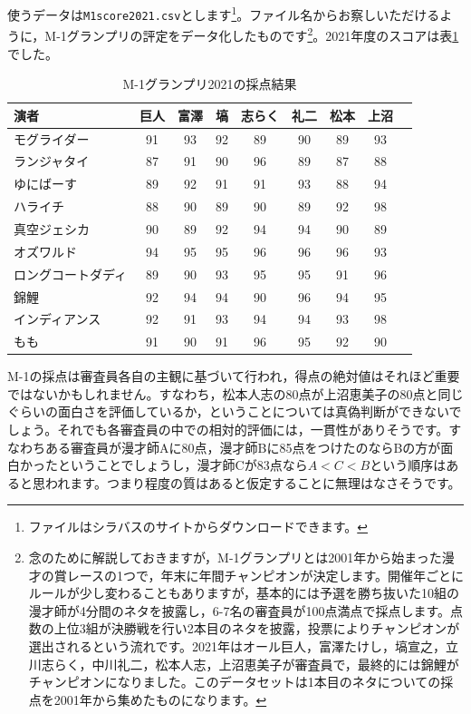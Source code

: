 \documentclass{ltjsbook}
\begin{document}
使うデータは\verb|M1score2021.csv|とします\footnote{ファイルはシラバスのサイトからダウンロードできます。}。ファイル名からお察しいただけるように，M-1グランプリの評定をデータ化したものです\footnote{念のために解説しておきますが，M-1グランプリとは2001年から始まった漫才の賞レースの1つで，年末に年間チャンピオンが決定します。開催年ごとにルールが少し変わることもありますが，基本的には予選を勝ち抜いた10組の漫才師が4分間のネタを披露し，6-7名の審査員が100点満点で採点します。点数の上位3組が決勝戦を行い2本目のネタを披露，投票によりチャンピオンが選出されるという流れです。2021年はオール巨人，富澤たけし，塙宣之，立川志らく，中川礼二，松本人志，上沼恵美子が審査員で，最終的には錦鯉がチャンピオンになりました。このデータセットは1本目のネタについての採点を2001年から集めたものになります。}。2021年度のスコアは表\ref{tbl:x15_m1}でした。

\begin{table}[ht]
    \centering
    \caption{M-1グランプリ2021の採点結果}
    \begin{tabular}{l|cccccccc}
        \hline
        演者               & 巨人 & 富澤 & 塙 & 志らく & 礼二 & 松本 & 上沼 \\
        \hline
        モグライダー       & 91   & 93   & 92 & 89     & 90   & 89   & 93   \\
        ランジャタイ       & 87   & 91   & 90 & 96     & 89   & 87   & 88   \\
        ゆにばーす         & 89   & 92   & 91 & 91     & 93   & 88   & 94   \\
        ハライチ           & 88   & 90   & 89 & 90     & 89   & 92   & 98   \\
        真空ジェシカ       & 90   & 89   & 92 & 94     & 94   & 90   & 89   \\
        オズワルド         & 94   & 95   & 95 & 96     & 96   & 96   & 93   \\
        ロングコートダディ & 89   & 90   & 93 & 95     & 95   & 91   & 96   \\
        錦鯉               & 92   & 94   & 94 & 90     & 96   & 94   & 95   \\
        インディアンス     & 92   & 91   & 93 & 94     & 94   & 93   & 98   \\
        もも               & 91   & 90   & 91 & 96     & 95   & 92   & 90   \\
        \hline
    \end{tabular}
    \label{tbl:x15_m1}
\end{table}


M-1の採点は審査員各自の主観に基づいて行われ，得点の絶対値はそれほど重要ではないかもしれません。すなわち，松本人志の80点が上沼恵美子の80点と同じぐらいの面白さを評価しているか，ということについては真偽判断ができないでしょう。それでも各審査員の中での相対的評価には，一貫性がありそうです。すなわちある審査員が漫才師Aに80点，漫才師Bに85点をつけたのならBの方が面白かったということでしょうし，漫才師Cが83点なら$A<C<B$という順序はあると思われます。つまり程度の質はあると仮定することに無理はなさそうです。
\end{document}
